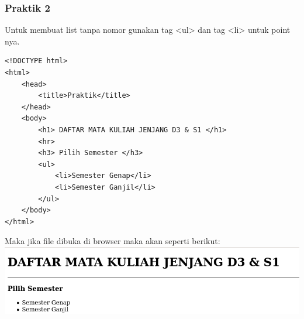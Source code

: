 \documentclass[a4paper,12pt]{article}
\begin{document}
\subsubsection{Praktik 2}
Untuk membuat list tanpa nomor gunakan tag <ul> dan tag <li> untuk point nya.
\begin{lstlisting}
<!DOCTYPE html>
<html>
    <head>
        <title>Praktik</title>
    </head>
    <body>
        <h1> DAFTAR MATA KULIAH JENJANG D3 & S1 </h1>
        <hr>
        <h3> Pilih Semester </h3>
        <ul>
            <li>Semester Genap</li>
            <li>Semester Ganjil</li>
        </ul>
    </body>
</html>
\end{lstlisting}
Maka jika file dibuka di browser maka akan seperti berikut:\\
\includegraphics[width=\linewidth]{3.png}
\end{document}
